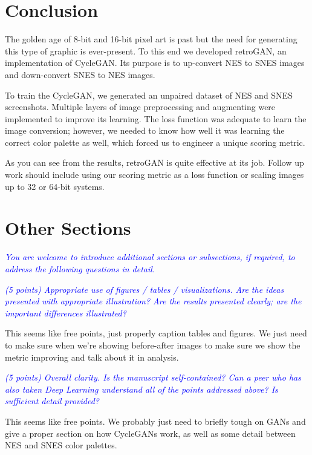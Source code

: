 \documentclass[10pt,twocolumn,letterpaper]{article}
\begin{document}
\section{Conclusion}

The golden age of 8-bit and 16-bit pixel art is past but the need for generating this type of graphic is ever-present. To this end we developed retroGAN, an implementation of CycleGAN. Its purpose is to up-convert NES to SNES images and down-convert SNES to NES images.

To train the CycleGAN, we generated an unpaired dataset of NES and SNES screenshots. Multiple layers of image preprocessing and augmenting were implemented to improve its learning. The loss function was adequate to learn the image conversion; however, we needed to know how well it was learning the correct color palette as well, which forced us to engineer a unique scoring metric.

As you can see from the results, retroGAN is quite effective at its job. Follow up work should include using our scoring metric as a loss function or scaling images up to 32 or 64-bit systems. 

\section{Other Sections}

\textit{\textcolor{blue}{You are welcome to introduce additional sections or subsections, if required, to address the following questions in detail.}}

\textit{\textcolor{blue}{(5 points) Appropriate use of figures / tables / visualizations. Are the ideas presented with appropriate illustration? Are the results presented clearly; are the important differences illustrated?}}

This seems like free points, just properly caption tables and figures. We just need to make sure when we're showing before-after images to make sure we show the metric improving and talk about it in analysis.

\textit{\textcolor{blue}{(5 points) Overall clarity. Is the manuscript self-contained? Can a peer who has also taken Deep Learning understand all of the points addressed above? Is sufficient detail provided?}}

This seems like free points. We probably just need to briefly tough on GANs and give a proper section on how CycleGANs work, as well as some detail between NES and SNES color palettes.
\end{document}
